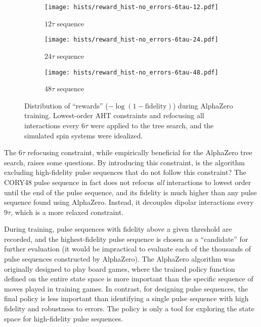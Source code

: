 \begin{figure}[H]
    \centering
    \begin{subfigure}{.49\textwidth}
        \centering
        \texttt{[image: hists/reward\_hist-no\_errors-6tau-12.pdf]}
        \caption{$12\tau$ sequence}
        \label{fig:reward_hist-no_errors-6tau-12}
    \end{subfigure}
    \begin{subfigure}{.49\textwidth}
        \centering
        \texttt{[image: hists/reward\_hist-no\_errors-6tau-24.pdf]}
        \caption{$24\tau$ sequence}
        \label{fig:reward_hist-no_errors-6tau-24}
    \end{subfigure}
    \begin{subfigure}{.49\textwidth}
        \centering
        \texttt{[image: hists/reward\_hist-no\_errors-6tau-48.pdf]}
        \caption{$48\tau$ sequence}
        \label{fig:reward_hist-no_errors-6tau-48}
    \end{subfigure}
    \caption{Distribution of ``rewards'' ($-\log(1 - \text{fidelity})$) during AlphaZero training. Lowest-order AHT constraints and refocusing all interactions every $6\tau$ were applied to the tree search, and the simulated spin systems were idealized.}
    \label{fig:reward_hist-no_errors-6tau}
\end{figure}

The $6\tau$ refocusing constraint, while empirically beneficial for the AlphaZero tree search, raises some questions. By introducing this constraint, is the algorithm excluding high-fidelity pulse sequences that do not follow this constraint? The CORY48 pulse sequence in fact does not refocus \emph{all} interactions to lowest order until the end of the pulse sequence, and its fidelity is much higher than any pulse sequence found using AlphaZero. Instead, it decouples dipolar interactions every $9\tau$, which is a more relaxed constraint.


During training, pulse sequences with fidelity above a given threshold are recorded, and the highest-fidelity pulse sequence is chosen as a ``candidate'' for further evaluation (it would be impractical to evaluate each of the thousands of pulse sequences constructed by AlphaZero).
The AlphaZero algorithm was originally designed to play board games, where the trained policy function defined on the entire state space is more important than the specific sequence of moves played in training games. In contrast, for designing pulse sequences, the final policy is less important than identifying a single pulse sequence with high fidelity and robustness to errors. The policy is only a tool for exploring the state space for high-fidelity pulse sequences.




